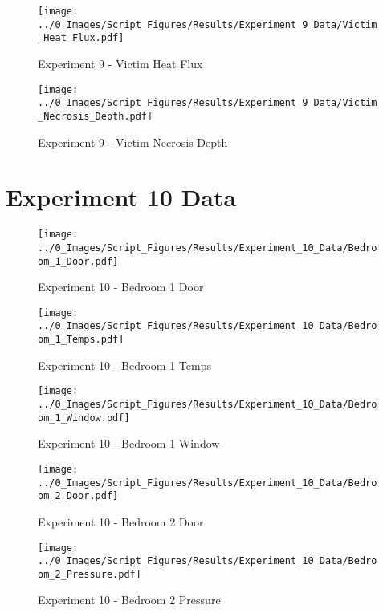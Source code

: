 	\clearpage

	\begin{figure}[H]
		\centering
		\texttt{[image: ../0\_Images/Script\_Figures/Results/Experiment\_9\_Data/Victim\_Heat\_Flux.pdf]}
		\caption[]{Experiment 9 - Victim Heat Flux}
	\end{figure}
 

	\begin{figure}[H]
		\centering
		\texttt{[image: ../0\_Images/Script\_Figures/Results/Experiment\_9\_Data/Victim\_Necrosis\_Depth.pdf]}
		\caption[]{Experiment 9 - Victim Necrosis Depth}
	\end{figure}
 
	\clearpage

\clearpage		\large
\section{Experiment 10 Data} \label{App:Exp10Results} 

	\begin{figure}[H]
		\centering
		\texttt{[image: ../0\_Images/Script\_Figures/Results/Experiment\_10\_Data/Bedroom\_1\_Door.pdf]}
		\caption[]{Experiment 10 - Bedroom 1 Door}
	\end{figure}
 

	\begin{figure}[H]
		\centering
		\texttt{[image: ../0\_Images/Script\_Figures/Results/Experiment\_10\_Data/Bedroom\_1\_Temps.pdf]}
		\caption[]{Experiment 10 - Bedroom 1 Temps}
	\end{figure}
 
	\clearpage

	\begin{figure}[H]
		\centering
		\texttt{[image: ../0\_Images/Script\_Figures/Results/Experiment\_10\_Data/Bedroom\_1\_Window.pdf]}
		\caption[]{Experiment 10 - Bedroom 1 Window}
	\end{figure}
 

	\begin{figure}[H]
		\centering
		\texttt{[image: ../0\_Images/Script\_Figures/Results/Experiment\_10\_Data/Bedroom\_2\_Door.pdf]}
		\caption[]{Experiment 10 - Bedroom 2 Door}
	\end{figure}
 
	\clearpage

	\begin{figure}[H]
		\centering
		\texttt{[image: ../0\_Images/Script\_Figures/Results/Experiment\_10\_Data/Bedroom\_2\_Pressure.pdf]}
		\caption[]{Experiment 10 - Bedroom 2 Pressure}
	\end{figure}
 

